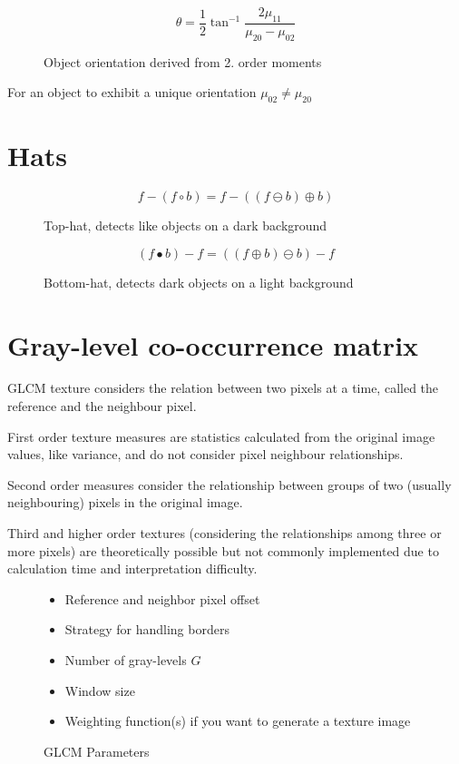 \documentclass[11pt]{report}
\begin{document}
\begin{figure}[!htb]
	\begin{equation}
		\theta = \frac{1}{2}\tan^{-1}{\frac{2 \mu_{11}}{\mu_{20} - \mu_{02}}}
	\end{equation}
	\caption{Object orientation derived from 2. order moments}
\end{figure}

For an object to exhibit a unique orientation $\mu_{02} \neq \mu_{20}$


\section*{Hats}
\begin{figure}[!htb]
	\begin{equation}
		f - (f \circ b) = f - ((f \ominus b) \oplus b)
	\end{equation}
	\caption{Top-hat, detects like objects on a dark background}
\end{figure}

\begin{figure}[!htb]
	\begin{equation}
		(f \bullet b) - f = ((f \oplus b) \ominus b) - f
	\end{equation}
	\caption{Bottom-hat, detects dark objects on a light background}
\end{figure}

\section*{Gray-level co-occurrence matrix}
GLCM texture considers the relation between two pixels at a time, called the reference and the neighbour pixel. 

First order texture measures are statistics calculated from the original image values, like variance, and do not consider pixel neighbour relationships.

Second order measures consider the relationship between groups of two (usually neighbouring) pixels in the original image.

Third and higher order textures (considering the relationships among three or more pixels) are theoretically possible but not commonly implemented due to calculation time and interpretation difficulty.

\begin{figure}[!htb]
	\begin{itemize}
    	\item Reference and neighbor pixel offset
		\item Strategy for handling borders
		\item Number of gray-levels $G$
		\item Window size
    	\item Weighting function(s) if you want to generate a texture image
	\end{itemize}
	\caption{GLCM Parameters}
\end{figure}
\end{document}
